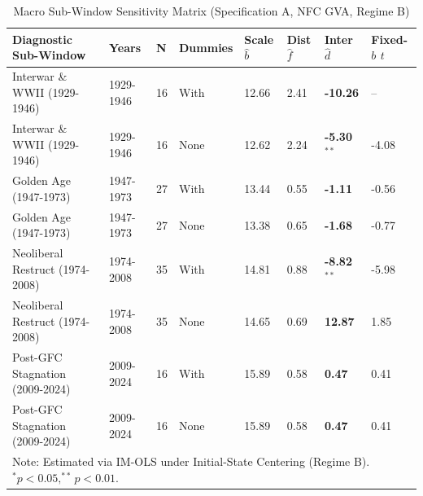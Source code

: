 \begin{table}[h!]
\centering
\small
\caption{Macro Sub-Window Sensitivity Matrix (Specification A, NFC GVA, Regime B)}
\label{tab:baseline_imols_diagnostics}
\begin{tabular}{p{4.2cm} p{1.6cm} p{0.6cm} p{1.6cm} p{1.4cm} p{1.4cm} p{2.0cm} p{1.6cm}}
\toprule
\textbf{Diagnostic Sub-Window} & \textbf{Years} & \textbf{N} & \textbf{Dummies} & \textbf{Scale $\hat{b}$} & \textbf{Dist $\hat{f}$} & \textbf{Inter $\hat{d}$} & \textbf{Fixed-$b$ $t$} \\
\midrule
Interwar \& WWII (1929-1946) & 1929-1946 & 16 & With & 12.66 & 2.41 & \textbf{-10.26} & -- \\
Interwar \& WWII (1929-1946) & 1929-1946 & 16 & None & 12.62 & 2.24 & \textbf{-5.30}$^{**}$ & -4.08 \\
Golden Age (1947-1973) & 1947-1973 & 27 & With & 13.44 & 0.55 & \textbf{-1.11} & -0.56 \\
Golden Age (1947-1973) & 1947-1973 & 27 & None & 13.38 & 0.65 & \textbf{-1.68} & -0.77 \\
Neoliberal Restruct (1974-2008) & 1974-2008 & 35 & With & 14.81 & 0.88 & \textbf{-8.82}$^{**}$ & -5.98 \\
Neoliberal Restruct (1974-2008) & 1974-2008 & 35 & None & 14.65 & 0.69 & \textbf{12.87} & 1.85 \\
Post-GFC Stagnation (2009-2024) & 2009-2024 & 16 & With & 15.89 & 0.58 & \textbf{0.47} & 0.41 \\
Post-GFC Stagnation (2009-2024) & 2009-2024 & 16 & None & 15.89 & 0.58 & \textbf{0.47} & 0.41 \\
\bottomrule
\multicolumn{8}{p{15.5cm}}{\footnotesize Note: Estimated via IM-OLS under Initial-State Centering (Regime B). $^*p<0.05, ^{**}p<0.01$.}
\end{tabular}
\end{table}
